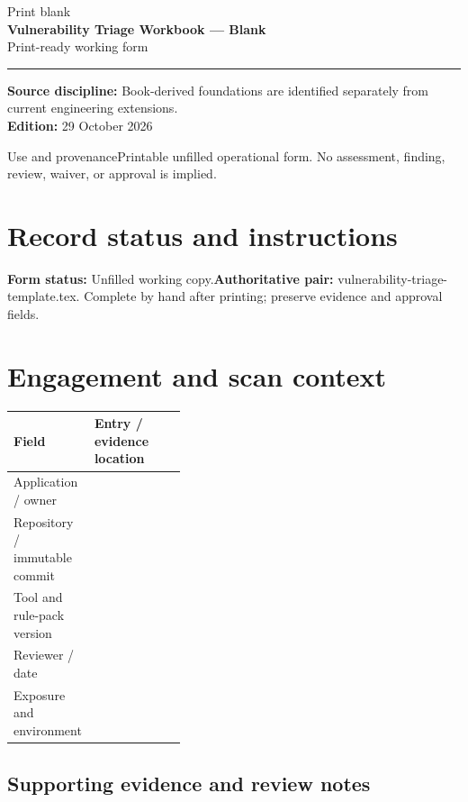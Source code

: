 \documentclass[10pt,letterpaper]{article}
\newcommand{\writearea}[1]{\par\begin{tcolorbox}[colback=white,colframe=linegray,boxrule=0.5pt,height=#1,sharp corners]\mbox{}\end{tcolorbox}\par}
\begin{document}
\hypersetup{pageanchor=false}%
\begin{titlepage}
\vspace*{1.0in}
{\color{bluegray}\Large Print blank}\\[1.0em]
{\color{navy}\Huge\bfseries Vulnerability Triage Workbook --- Blank}\\[0.7em]
{\Large Print-ready working form}\\[2.0em]
\rule{\linewidth}{1.0pt}
\vfill
\textbf{Source discipline:} Book-derived foundations are identified separately from current engineering extensions.\\
\textbf{Edition:} 29 October 2026
\end{titlepage}\hypersetup{pageanchor=true}
\tableofcontents
\clearpage
\begin{focusbox}{Use and provenance}Printable unfilled operational form. No assessment, finding, review, waiver, or approval is implied.\end{focusbox}
\section{Record status and instructions}
\textbf{Form status:} Unfilled working copy.\quad\textbf{Authoritative pair:} vulnerability-triage-template.tex. Complete by hand after printing; preserve evidence and approval fields.

\section{Engagement and scan context}
\begin{tabularx}{\linewidth}{@{}p{0.38\linewidth}Y@{}}
\toprule Field & Entry / evidence location\\\midrule
Application / owner & \\[1.0em]
\midrule
Repository / immutable commit & \\[1.0em]
\midrule
Tool and rule-pack version & \\[1.0em]
\midrule
Reviewer / date & \\[1.0em]
\midrule
Exposure and environment & \\[1.0em]
\midrule
\end{tabularx}
\subsection{Supporting evidence and review notes}
\writearea{1.45in}
\clearpage
\end{document}
